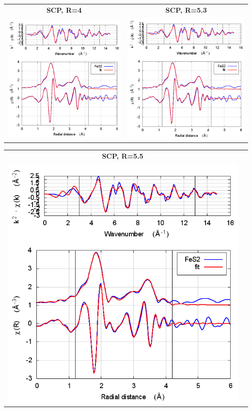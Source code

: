 \documentclass[11pt]{article}
\begin{document}
\begin{center}
  \begin{tabular}{cc}
    \textbf{SCP, R=4} & \textbf{SCP, R=5.3} \\
    \includegraphics[width=.45\linewidth]{FeS2/scf/fit_withSCF_4.png} & 
    \includegraphics[width=.45\linewidth]{FeS2/scf/fit_withSCF_5.3.png} \\
  \end{tabular}
\end{center}
\begin{center}
  \begin{tabular}{cc}
    \textbf{SCP, R=5.5}&\\
    \includegraphics[width=.45\linewidth]{FeS2/scf/fit_withSCF_5.5.png}&\\
  \end{tabular}
\end{center}
\end{document}
